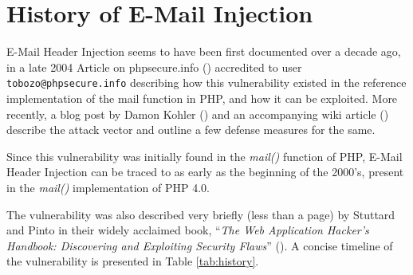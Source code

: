 \section{History of E-Mail Injection}

E-Mail Header Injection seems to have been first documented over a decade ago, in a late 2004 Article on phpsecure.info (\cite{Tobozo}) accredited to user \lstinline|tobozo@phpsecure.info| describing how this vulnerability existed in the reference implementation of the mail function in PHP, and how it can be exploited. More recently, a blog post by Damon Kohler (\cite{DK}) and an accompanying wiki article (\cite{Injection}) describe the attack vector and outline a few defense measures for the same.

Since this vulnerability was initially found in the \emph{mail()} function of PHP, E-Mail Header Injection can be traced to as early as the beginning of the 2000's, present in the \emph{mail()} implementation of PHP 4.0. 

The vulnerability was also described very briefly (less than a page) by Stuttard and Pinto in their widely acclaimed book, ``\emph{The Web Application Hacker's Handbook: Discovering and Exploiting Security Flaws}'' (\cite{stuttard2011web}). 
A concise timeline of the vulnerability is presented in Table \ref{tab:history}.


